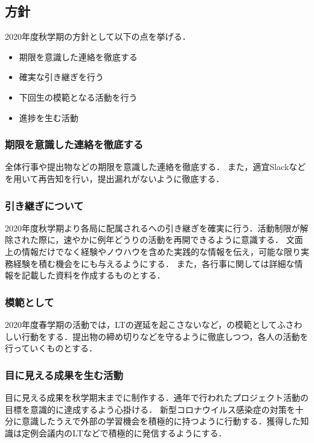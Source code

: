 \subsection*{\secondGrade{}方針}


2020年度秋学期の\secondGrade{}方針として以下の点を挙げる．

\begin{itemize}
    \item 期限を意識した連絡を徹底する
    \item 確実な引き継ぎを行う
    \item 下回生の模範となる活動を行う
    \item 進捗を生む活動
\end{itemize}

\subsubsection*{期限を意識した連絡を徹底する}
全体行事や提出物などの期限を意識した連絡を徹底する．
また，適宜Slackなどを用いて再告知を行い，提出漏れがないように徹底する．

\subsubsection*{引き継ぎについて}
2020年度秋学期より各局に配属される\firstGrade{}への引き継ぎを確実に行う．活動制限が解除された際に，速やかに例年どうりの活動を再開できるように意識する．
文面上の情報だけでなく経験やノウハウを含めた実践的な情報を伝え，可能な限り実務経験を積む機会を\firstGrade{}にも与えるようにする．
また，各行事に関しては詳細な情報を記載した資料を作成するものとする．

\subsubsection*{模範として}
2020年度春学期の活動では，LTの遅延を起こさないなど，\firstGrade{}の模範としてふさわしい行動をする．提出物の締め切りなどを守るように徹底しつつ，各人の活動を行っていくものとする．

\subsubsection*{目に見える成果を生む活動}
目に見える成果を秋学期末までに制作する．通年で行われたプロジェクト活動の目標を意識的に達成するよう心掛ける．
新型コロナウイルス感染症の対策を十分に意識したうえで外部の学習機会を積極的に持つように行動する．獲得した知識は定例会議内のLTなどで積極的に発信するようにする．

